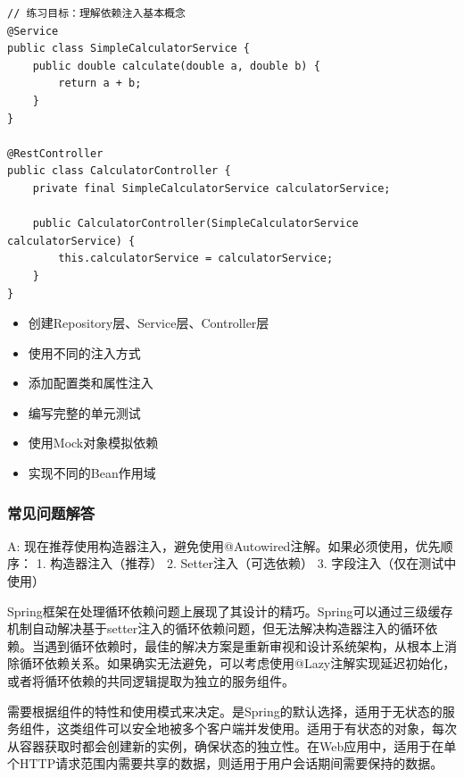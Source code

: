 \begin{lstlisting}[style=java]
// 练习目标：理解依赖注入基本概念
@Service
public class SimpleCalculatorService {
    public double calculate(double a, double b) {
        return a + b;
    }
}

@RestController
public class CalculatorController {
    private final SimpleCalculatorService calculatorService;
    
    public CalculatorController(SimpleCalculatorService calculatorService) {
        this.calculatorService = calculatorService;
    }
}
\end{lstlisting}


\begin{itemize}
\tightlist
\item
  创建Repository层、Service层、Controller层
\item
  使用不同的注入方式
\item
  添加配置类和属性注入
\end{itemize}


\begin{itemize}
\tightlist
\item
  编写完整的单元测试
\item
  使用Mock对象模拟依赖
\item
  实现不同的Bean作用域
\end{itemize}

\hypertarget{ux5e38ux89c1ux95eeux9898ux89e3ux7b54-1}{%
\subsubsection{常见问题解答}\label{ux5e38ux89c1ux95eeux9898ux89e3ux7b54-1}}


A: 现在推荐使用构造器注入，避免使用@Autowired注解。如果必须使用，优先顺序： 1. 构造器注入（推荐） 2. Setter注入（可选依赖） 3. 字段注入（仅在测试中使用）

Spring框架在处理循环依赖问题上展现了其设计的精巧。Spring可以通过三级缓存机制自动解决基于setter注入的循环依赖问题，但无法解决构造器注入的循环依赖。当遇到循环依赖时，最佳的解决方案是重新审视和设计系统架构，从根本上消除循环依赖关系。如果确实无法避免，可以考虑使用@Lazy注解实现延迟初始化，或者将循环依赖的共同逻辑提取为独立的服务组件。

需要根据组件的特性和使用模式来决定。是Spring的默认选择，适用于无状态的服务组件，这类组件可以安全地被多个客户端并发使用。适用于有状态的对象，每次从容器获取时都会创建新的实例，确保状态的独立性。在Web应用中，适用于在单个HTTP请求范围内需要共享的数据，则适用于用户会话期间需要保持的数据。

